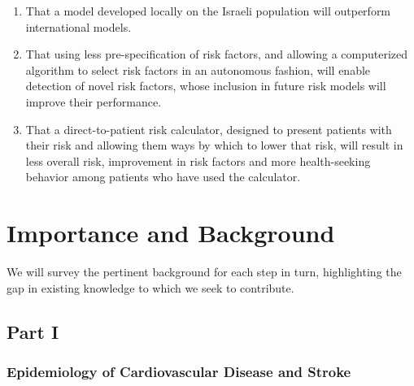 \documentclass[a4paper,12pt]{article}
\begin{document}
\begin{description}
\begin{enumerate}
			\item That a model developed locally on the Israeli population will outperform international models.
			
			\item That using less pre-specification of risk factors, and allowing a computerized algorithm to select risk factors in an autonomous fashion, will enable detection of novel risk factors, whose inclusion in future risk models will improve their performance.
			
			\item That a direct-to-patient risk calculator, designed to present patients with their risk and allowing them ways by which to lower that risk, will result in less overall risk, improvement in risk factors and more health-seeking behavior among patients who have used the calculator.
			
		\end{enumerate}
		
	\end{description}
	
	\section{Importance and Background}
	
	We will survey the pertinent background for each step in turn, highlighting the gap in existing knowledge to which we seek to contribute.
	
		\subsection{Part I}
		
			\subsubsection{Epidemiology of Cardiovascular Disease and Stroke}
			
\end{document}
